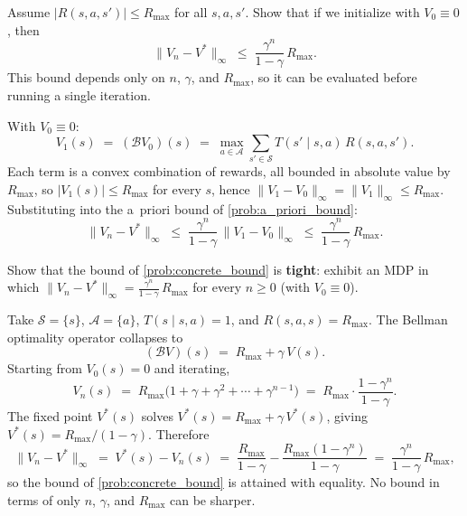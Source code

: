 \documentclass[11pt]{article}
\newcommand{\cS}{\mathcal{S}}
\newcommand{\cA}{\mathcal{A}}
\begin{document}
\begin{exercise}
\label{prob:concrete_bound} Assume $|R(s,a,s')| \le R_{\max}$ for all $s,a,s'$. Show that if we initialize with $V_0 \equiv 0$, then
$$
\|V_n - V^*\|_\infty \;\le\; \frac{\gamma^n}{1-\gamma}\, R_{\max}.
$$
This bound depends only on $n$, $\gamma$, and $R_{\max}$, so it can be evaluated before running a single iteration.
\end{exercise}

\begin{solution}
With $V_0 \equiv 0$:
$$
V_1(s) \;=\; (\mathcal{B} V_0)(s) \;=\; \max_{a \in \cA} \sum_{s' \in \cS} T(s' \mid s, a)\, R(s,a,s').
$$
Each term is a convex combination of rewards, all bounded in absolute value by $R_{\max}$, so $|V_1(s)| \le R_{\max}$ for every $s$, hence $\|V_1 - V_0\|_\infty = \|V_1\|_\infty \le R_{\max}$. Substituting into the a~priori bound of \cref{prob:a_priori_bound}:
$$
\|V_n - V^*\|_\infty \;\le\; \frac{\gamma^n}{1-\gamma}\, \|V_1 - V_0\|_\infty \;\le\; \frac{\gamma^n}{1-\gamma}\, R_{\max}.
$$
\end{solution}

\begin{exercise}
\label{prob:bound_tight} Show that the bound of \cref{prob:concrete_bound} is \textbf{tight}: exhibit an MDP in which $\|V_n - V^*\|_\infty = \frac{\gamma^n}{1-\gamma}\, R_{\max}$ for every $n \ge 0$ (with $V_0 \equiv 0$).
\end{exercise}

\begin{solution}
Take $\cS = \{s\}$, $\cA = \{a\}$, $T(s \mid s, a) = 1$, and $R(s, a, s) = R_{\max}$. The Bellman optimality operator collapses to
$$
(\mathcal{B} V)(s) \;=\; R_{\max} + \gamma\, V(s).
$$
Starting from $V_0(s) = 0$ and iterating,
$$
V_n(s) \;=\; R_{\max}\bigl(1 + \gamma + \gamma^2 + \cdots + \gamma^{n-1}\bigr) \;=\; R_{\max} \cdot \frac{1 - \gamma^n}{1 - \gamma}.
$$
The fixed point $V^*(s)$ solves $V^*(s) = R_{\max} + \gamma\, V^*(s)$, giving $V^*(s) = R_{\max}/(1-\gamma)$. Therefore
$$
\|V_n - V^*\|_\infty \;=\; V^*(s) - V_n(s) \;=\; \frac{R_{\max}}{1-\gamma} - \frac{R_{\max}(1 - \gamma^n)}{1-\gamma} \;=\; \frac{\gamma^n}{1-\gamma}\, R_{\max},
$$
so the bound of \cref{prob:concrete_bound} is attained with equality. No bound in terms of only $n$, $\gamma$, and $R_{\max}$ can be sharper.
\end{solution}
\end{document}
